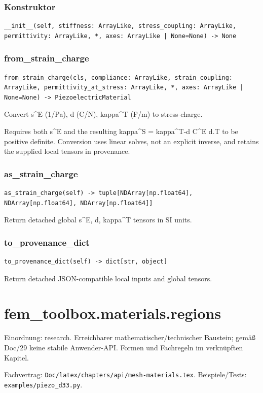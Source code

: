 \subsubsection*{Konstruktor}
\begin{lstlisting}
__init__(self, stiffness: ArrayLike, stress_coupling: ArrayLike, permittivity: ArrayLike, *, axes: ArrayLike | None=None) -> None
\end{lstlisting}
\subsubsection*{from\_strain\_charge}
\begin{lstlisting}
from_strain_charge(cls, compliance: ArrayLike, strain_coupling: ArrayLike, permittivity_at_stress: ArrayLike, *, axes: ArrayLike | None=None) -> PiezoelectricMaterial
\end{lstlisting}
Convert s\textasciicircum{}E (1/Pa), d (C/N), kappa\textasciicircum{}T (F/m) to stress-charge.\par Requires both s\textasciicircum{}E and the resulting kappa\textasciicircum{}S = kappa\textasciicircum{}T-d C\textasciicircum{}E d.T to be positive definite. Conversion uses linear solves, not an explicit inverse, and retains the supplied local tensors in provenance.
\subsubsection*{as\_strain\_charge}
\begin{lstlisting}
as_strain_charge(self) -> tuple[NDArray[np.float64], NDArray[np.float64], NDArray[np.float64]]
\end{lstlisting}
Return detached global s\textasciicircum{}E, d, kappa\textasciicircum{}T tensors in SI units.
\subsubsection*{to\_provenance\_dict}
\begin{lstlisting}
to_provenance_dict(self) -> dict[str, object]
\end{lstlisting}
Return detached JSON-compatible local inputs and global tensors.
\section{fem\_toolbox.materials.regions}
Einordnung: research. Erreichbarer mathematischer/technischer Baustein; gemäß Doc/29 keine stabile Anwender-API. Formen und Fachregeln im verknüpften Kapitel.
\par Fachvertrag: \nolinkurl{Doc/latex/chapters/api/mesh-materials.tex}. Beispiele/Tests:
\nolinkurl{examples/piezo_d33.py}.
